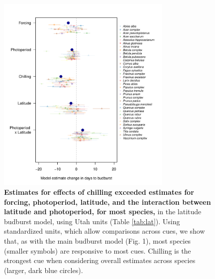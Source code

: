 \documentclass{article}
\begin{document}
\begin{figure}[h!]
\centering
\noindent \includegraphics[width=0.75\textwidth]{..//..//analyses/lat_analysis/figures/latanalysis_spcom_expramp_fp.pdf}
\caption{\textbf{Estimates for effects of chilling exceeded estimates for forcing, photoperiod, latitude, and the interaction between latitude and photoperiod, for most species,} in the latitude budburst model, using Utah units (Table \ref{tab:lat}). Using standardized units, which allow comparisons across cues, we show that, as with the main budburst model (Fig. 1), most species (smaller symbols) are responsive to most cues. Chilling is the strongest cue when considering overall estimates across species (larger, dark blue circles).}
\label{fig:lat}
\end{figure}
\end{document}
